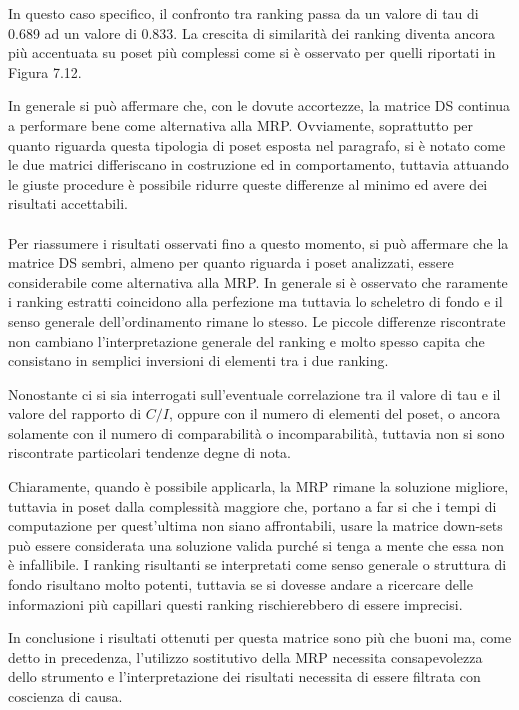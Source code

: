 \documentclass{report}
\begin{document}
In questo caso specifico, il confronto tra ranking passa da un valore di tau di 0.689 ad un valore di 0.833. La crescita di similarità dei ranking diventa ancora più accentuata su poset più complessi come si è osservato per quelli riportati in Figura 7.12.


In generale si può affermare che, con le dovute accortezze, la matrice DS continua a performare bene come alternativa alla MRP. Ovviamente, soprattutto per quanto riguarda questa tipologia di poset esposta nel paragrafo, si è notato come le due matrici differiscano in costruzione ed in comportamento, tuttavia attuando le giuste procedure è possibile ridurre queste differenze al minimo ed avere dei risultati accettabili.
\\~\\
Per riassumere i risultati osservati fino a questo momento, si può affermare che la matrice DS sembri, almeno per quanto riguarda i poset analizzati, essere considerabile come alternativa alla MRP. In generale si è osservato che raramente i ranking estratti coincidono alla perfezione ma tuttavia lo scheletro di fondo e il senso generale dell'ordinamento rimane lo stesso. Le piccole differenze riscontrate non cambiano l'interpretazione generale del ranking e molto spesso capita che consistano in semplici inversioni di elementi tra i due ranking.


Nonostante ci si sia interrogati sull'eventuale correlazione tra il valore di tau e il valore del rapporto di $C/I$, oppure con il numero di elementi del poset, o ancora solamente con il numero di comparabilità o incomparabilità, tuttavia non si sono riscontrate particolari tendenze degne di nota.


Chiaramente, quando è possibile applicarla, la MRP rimane la soluzione migliore, tuttavia in poset dalla complessità maggiore che, portano a far si che i tempi di computazione per quest'ultima non siano affrontabili, usare la matrice down-sets può essere considerata una soluzione valida purché si tenga a mente che essa non è infallibile. I ranking risultanti se interpretati come senso generale o struttura di fondo risultano molto potenti, tuttavia se si dovesse andare a ricercare delle informazioni più capillari questi ranking rischierebbero di essere imprecisi.


In conclusione i risultati ottenuti per questa matrice sono più che buoni ma, come detto in precedenza, l'utilizzo sostitutivo della MRP necessita consapevolezza dello strumento e l'interpretazione dei risultati necessita di essere filtrata con coscienza di causa. 
\end{document}
